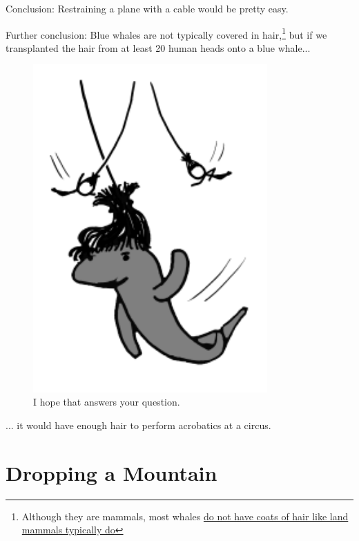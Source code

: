 {{Conclusion: Restraining a plane with a cable would be pretty easy.}

{Further conclusion: Blue whales are not typically covered in hair,{\footnote{Although they are mammals, most whales \href{http://bioweb.uwlax.edu/bio203/s2012/olson\_rile/adaptation.htm}{do not have coats of hair like land mammals typically do}} } but if we transplanted the hair from at least 20 human heads onto a blue whale...}

\begin{figure}[!htbp]
\centering
\includegraphics[scale=0.5, max width=0.8\textwidth]{imgs/a/56/747_whale_hang.png}
\caption{I hope that answers your question.}
\end{figure}

{... it would have enough hair to perform acrobatics at a circus.}

{
\chapter{Dropping a Mountain}
}

}

